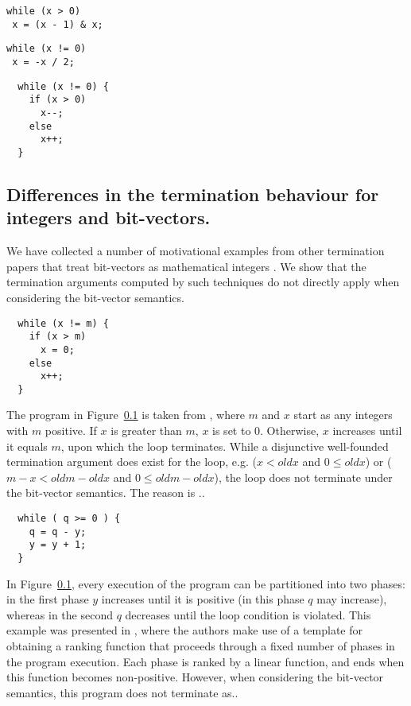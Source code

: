 \documentclass[preprint]{sigplanconf}
\theoremstyle{definition}
\begin{document}
\begin{lstlisting}
while (x > 0)
 x = (x - 1) & x;
\end{lstlisting}

\begin{lstlisting}
while (x != 0)
 x = -x / 2;
\end{lstlisting}

\begin{lstlisting}
  while (x != 0) {
    if (x > 0)
      x--;
    else
      x++;
  }
\end{lstlisting}

\subsection{Differences in the termination behaviour for integers and bit-vectors.}
We have collected a number of motivational examples from other termination papers that treat bit-vectors as mathematical integers \cite{DBLP:conf/tacas/LeikeH14,DBLP:conf/tacas/CookSZ13}. 
We show that the termination arguments computed by such techniques do not directly apply when considering the bit-vector semantics.

\begin{lstlisting}
  while (x != m) {
    if (x > m)
      x = 0;
    else
      x++;
  }
\end{lstlisting}

The program in Figure~\ref{} is taken from \cite{DBLP:conf/tacas/CookSZ13}, where
$m$ and $x$ start as any integers with $m$ positive. If $x$ is greater than
$m$, $x$ is set to 0. Otherwise, $x$ increases until it equals $m$, upon which
the loop terminates. While a disjunctive well-founded termination argument does exist for the loop, 
e.g. ($x < oldx$ and $0 \leq oldx$) or ($m-x < oldm-oldx$ and $0 \leq oldm-oldx$), the loop does not 
terminate under the bit-vector semantics. The reason is ..

\begin{lstlisting}
  while ( q >= 0 ) {
    q = q - y;
    y = y + 1;
  }
\end{lstlisting}

In Figure~\ref{}, every execution of the program can be partitioned into two phases: in the first phase $y$ increases
until it is positive (in this phase $q$ may increase), whereas in the second $q$ decreases until the loop condition is violated. 
This example was presented in \cite{DBLP:conf/tacas/LeikeH14}, where the authors make use of a template for obtaining a ranking function that proceeds
through a fixed number of phases in the program execution. Each phase is ranked by a linear function, and ends when this function becomes non-positive.
However, when considering the bit-vector semantics, this program does not terminate as..
\end{document}

